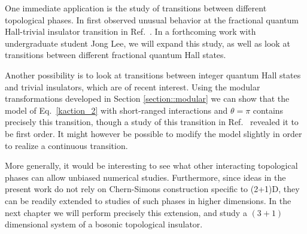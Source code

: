 One immediate application is the study of transitions between different topological phases. In first observed unusual behavior at the fractional quantum Hall-trivial insulator transition in Ref.~\cite{short_range3}. In a forthcoming work with undergraduate student Jong Lee, we will expand this study, as well as look at transitions between different fractional quantum Hall states.

Another possibility is to look at transitions between integer quantum Hall states and trivial insulators, which are of recent interest.\cite{GroverVishwanath2012, LuLee2012_QPT} Using the modular transformations developed in Section \ref{section::modular} we can show that the model of Eq.~\ref{kaction_2} with short-ranged interactions and $\theta=\pi$ contains precisely this transition, though a study of this transition in Ref.~\cite{Loopy} revealed it to be first order. It might however be possible to modify the model slightly in order to realize a continuous transition.

More generally, it would be interesting to see what other interacting topological phases can allow unbiased numerical studies. Furthermore, since ideas in the present work do not rely on Chern-Simons construction specific to (2+1)D, they can be readily extended to studies of such phases in higher dimensions.\cite{VishwanathSenthil2012, KeyserlingkBurnellSimon2013, XuSenthil2013, Wen2013}
In the next chapter we will perform precisely this extension, and study a $(3+1)$ dimensional system of a bosonic topological insulator.



